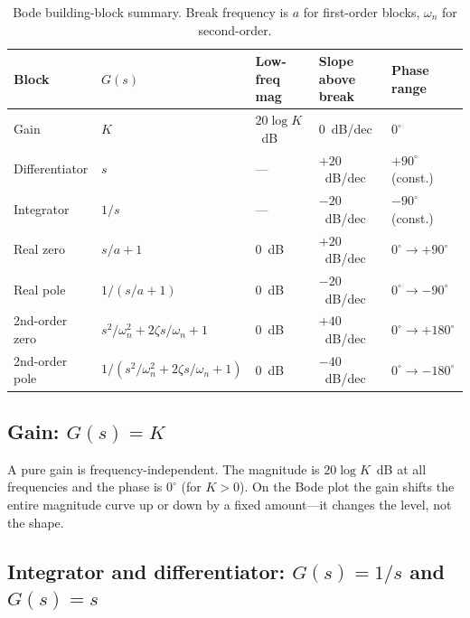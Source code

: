 \documentclass[../../book.tex]{subfiles}
\begin{document}
\begin{table}[htbp]
\centering
\caption{Bode building-block summary.  Break frequency is $a$ for first-order
  blocks, $\omega_n$ for second-order.}
\label{tab:building_blocks}
\begin{tabular}{@{}lllll@{}}
\toprule
Block & $G(s)$ & Low-freq mag & Slope above break & Phase range \\
\midrule
Gain          & $K$                     & $20\log K$~dB & 0~dB/dec      & $0^\circ$ \\
Differentiator & $s$                   & ---           & $+20$~dB/dec  & $+90^\circ$ (const.) \\
Integrator    & $1/s$                   & ---           & $-20$~dB/dec  & $-90^\circ$ (const.) \\
Real zero     & $s/a + 1$               & 0~dB          & $+20$~dB/dec  & $0^\circ \to +90^\circ$ \\
Real pole     & $1/(s/a + 1)$           & 0~dB          & $-20$~dB/dec  & $0^\circ \to -90^\circ$ \\
2nd-order zero & $s^2/\omega_n^2 + 2\zeta s/\omega_n + 1$ & 0~dB & $+40$~dB/dec & $0^\circ \to +180^\circ$ \\
2nd-order pole & $1/(s^2/\omega_n^2 + 2\zeta s/\omega_n + 1)$ & 0~dB & $-40$~dB/dec & $0^\circ \to -180^\circ$ \\
\bottomrule
\end{tabular}
\end{table}

\subsection{Gain: \texorpdfstring{$G(s) = K$}{G(s) = K}}
\label{sec:gain_block}

A pure gain is frequency-independent.  The magnitude is $20\log K$~dB at all
frequencies and the phase is $0^\circ$ (for $K > 0$).  On the Bode plot the
gain shifts the entire magnitude curve up or down by a fixed amount---it
changes the level, not the shape.

\subsection{Integrator and differentiator: \texorpdfstring{$G(s) = 1/s$
and $G(s) = s$}{G(s) = 1/s and G(s) = s}}
\label{sec:integrator}
\end{document}
